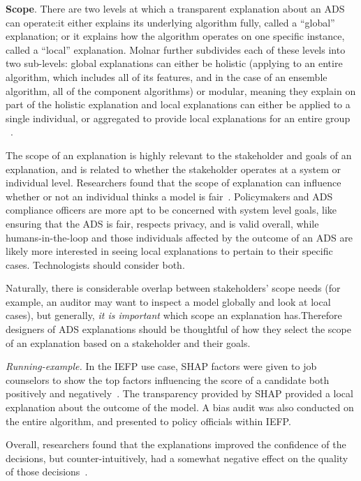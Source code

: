 \textbf{Scope}\label{subsec:scope}. There are two levels at which a transparent explanation about an ADS can operate:it either explains its underlying algorithm fully, called a ``global'' explanation; or it explains how the algorithm operates on one specific instance, called a ``local'' explanation. Molnar further subdivides each of these levels into two sub-levels: global explanations can either be holistic (applying to an entire algorithm, which includes all of its features, and in the case of an ensemble algorithm, all of the component algorithms) or modular, meaning they explain on part of the holistic explanation and local explanations can either be applied to a single individual, or aggregated to provide local explanations for an entire group ~\cite{molnar2019}.

The scope of an explanation is highly relevant to the stakeholder and goals of an explanation, and is related to whether the stakeholder operates at a system or individual level. Researchers found that the scope of explanation can influence whether or not an individual thinks a model is fair~\cite{DBLP:journals/corr/abs-2101-09429,DBLP:conf/chi/LiaoGM20}. Policymakers and ADS compliance officers are more apt to be concerned with system level goals, like ensuring that the ADS is fair, respects privacy, and is valid overall, while humans-in-the-loop and those individuals affected by the outcome of an ADS are likely more interested in seeing local explanations to pertain to their specific cases. Technologists should consider both.

Naturally, there is considerable overlap between stakeholders' scope needs (for example, an auditor may want to inspect a model globally and look at local cases), but generally, \textit{it is important} which scope an explanation has.Therefore designers of ADS explanations should be thoughtful of how they select the scope of an explanation based on a stakeholder and their goals.

\emph{Running-example.} In the IEFP use case, SHAP factors were given to job counselors to show the top factors influencing the score of a candidate both positively and negatively~\cite{zejnilovic2020algorithmic}. The transparency provided by SHAP provided a local explanation about the outcome of the model. A bias audit was also conducted on the entire algorithm, and presented to policy officials within IEFP.

Overall, researchers found that the explanations improved the confidence of the decisions, but counter-intuitively, had a somewhat negative effect on the quality of those decisions~\cite{zejnilovic2020algorithmic}.

